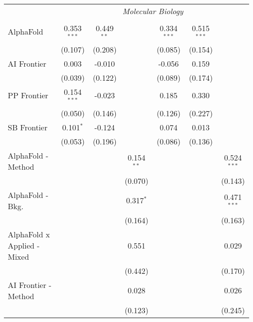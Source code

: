\begin{tabular}{lcccccc}
 & \multicolumn{6}{c}{\textit{Molecular Biology}} \\ \\
   AlphaFold                     & 0.353$^{***}$ & 0.449$^{**}$ &              & 0.334$^{***}$ & 0.515$^{***}$ &   \\   
                                 & (0.107)       & (0.208)      &              & (0.085)       & (0.154)       &   \\   
   AI Frontier                   & 0.003         & -0.010       &              & -0.056        & 0.159         &   \\   
                                 & (0.039)       & (0.122)      &              & (0.089)       & (0.174)       &   \\   
   PP Frontier                   & 0.154$^{***}$ & -0.023       &              & 0.185         & 0.330         &   \\   
                                 & (0.050)       & (0.146)      &              & (0.126)       & (0.227)       &   \\   
   SB Frontier                   & 0.101$^{*}$   & -0.124       &              & 0.074         & 0.013         &   \\   
                                 & (0.053)       & (0.196)      &              & (0.086)       & (0.136)       &   \\   
   AlphaFold - Method            &               &              & 0.154$^{**}$ &               &               & 0.524$^{***}$\\   
                                 &               &              & (0.070)      &               &               & (0.143)\\   
   AlphaFold - Bkg.              &               &              & 0.317$^{*}$  &               &               & 0.471$^{***}$\\   
                                 &               &              & (0.164)      &               &               & (0.163)\\   
   AlphaFold x Applied - Mixed   &               &              & 0.551        &               &               & 0.029\\   
                                 &               &              & (0.442)      &               &               & (0.170)\\   
   AI Frontier - Method          &               &              & 0.028        &               &               & 0.026\\   
                                 &               &              & (0.123)      &               &               & (0.245)\\   

\end{tabular}
